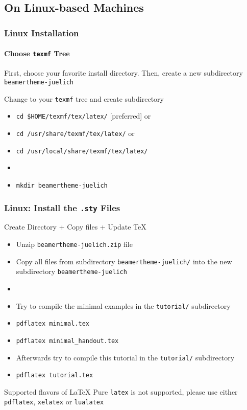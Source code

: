 \subsection{On Linux-based Machines}
\begin{frame}[fragile]
        \frametitle{Linux Installation}
        \framesubtitle{Choose {\tt texmf} Tree}
        First, choose your favorite install directory.  \newline
        Then, create a new subdirectory \verb+beamertheme-juelich+
        \begin{block}{Change to your {\tt texmf} tree and create subdirectory}
    \begin{itemize}
      \item \verb+cd $HOME/texmf/tex/latex/+ \hfill \textcolor{fzjblue}{[preferred]} or
      \item \verb+cd /usr/share/texmf/tex/latex/+ \hfill or
      \item \verb+cd /usr/local/share/texmf/tex/latex/+ \hfill
      \item[]
      \item \verb+mkdir beamertheme-juelich+
    \end{itemize}
    \end{block}
\end{frame}

\begin{frame}[fragile]
        \frametitle{Linux: Install the {\tt .sty} Files}
        \begin{block}{Create Directory + Copy files + Update \TeX}
        \begin{itemize}
                \item Unzip \verb+beamertheme-juelich.zip+ file
                \item Copy all files from subdirectory \verb+beamertheme-juelich/+ into
                the new subdirectory \verb+beamertheme-juelich+
                \item[]
                \item Try to compile the minimal examples in the \verb+tutorial/+ subdirectory
                \item[] \verb+pdflatex minimal.tex+
                \item[] \verb+pdflatex minimal_handout.tex+
                \item Afterwards try to compile this tutorial in the \verb+tutorial/+ subdirectory
                \item[] \verb+pdflatex tutorial.tex+
        \end{itemize}
    \end{block}
    \begin{alertblock}{Supported flavors of \LaTeX{}}
    Pure \verb+latex+ is not supported, please use either \verb+pdflatex+, \verb+xelatex+ or \verb+lualatex+
    \end{alertblock}
\end{frame}

